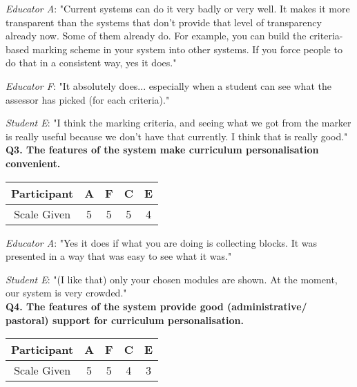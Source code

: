 \textit{Educator A}: "Current systems can do it very badly or very well. It makes it more transparent than
the systems that don't provide that level of transparency already now. Some of them already do. For example,
you can build the criteria-based marking scheme in your system into other systems. If you force people to do that
in a consistent way, yes it does."

\textit{Educator F}: "It absolutely does...
especially when a student can see what the assessor has picked (for each criteria)."

\textit{Student E}: "I think the marking criteria, and seeing what we got from the marker is really useful 
because we don't have that currently. I think that is really good."\\

\textbf{Q3. The features of the system make curriculum personalisation convenient.}\\
\begin{table}[!ht]
	\centering
	\begin{tabularx}{0.325\textwidth}{|c|c|c|c|c|}
		\hline
		Participant & A                  & F                  & C                  & E \\
		\hline
		Scale Given & \cellcolor{green}5 & \cellcolor{green}5 & \cellcolor{green}5 & \cellcolor{SpringGreen}4 \\
		\hline
	\end{tabularx}
\end{table}

\textit{Educator A}: "Yes it does if what you are doing is collecting blocks. It was presented in a way that was
easy to see what it was."

\textit{Student E}: "(I like that) only your chosen modules are shown. At the moment, our system is very crowded."\\

\textbf{Q4. The features of the system provide good (administrative/ pastoral) support for curriculum personalisation.}\\
\begin{table}[!ht]
	\centering
	\begin{tabularx}{0.325\textwidth}{|c|c|c|c|c|}
		\hline
		Participant & A                  & F                  & C                  & E \\
		\hline
		Scale Given & \cellcolor{green}5 & \cellcolor{green}5 & \cellcolor{SpringGreen}4 & \cellcolor{Dandelion}3 \\
		\hline
	\end{tabularx}
\end{table}

